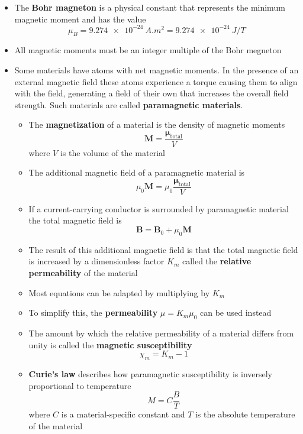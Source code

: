 \documentclass{article}
\begin{document}
\begin{itemize}
  \item The \textbf{Bohr magneton} is a physical constant that represents the minimum magnetic moment and has the value \[\mu_B = \qty{9.274e-24}{A.m^2} = \qty{9.274e-24}{J/T}\]

  \item All magnetic moments must be an integer multiple of the Bohr megneton

  \item Some materials have atoms with net magnetic moments. In the presence of an external magnetic field these atoms experience a torque causing them to align with the field, generating a field of their own that increases the overall field strength. Such materials are called \textbf{paramagnetic materials}.

        \begin{itemize}
          \item The \textbf{magnetization} of a material is the density of magnetic moments \[\mathbf{M} = \frac{\boldsymbol{\mu}_\textrm{total}}{V}\] where $V$ is the volume of the material

          \item The additional magnetic field of a paramagnetic material is \[\mu_0 \mathbf{M} = \mu_0 \frac{\boldsymbol{\mu}_\textrm{total}}{V}\]

          \item If a current-carrying conductor is surrounded by paramagnetic material the total magnetic field is \[\mathbf{B} = \mathbf{B}_0 + \mu_0 \mathbf{M}\]

          \item The result of this additional magnetic field is that the total magnetic field is increased by a dimensionless factor $K_m$ called the \textbf{relative permeability} of the material

          \item Most equations can be adapted by multiplying by $K_m$

          \item To simplify this, the \textbf{permeability} $\mu = K_m \mu_0$ can be used instead

          \item The amount by which the relative permeability of a material differs from unity is called the \textbf{magnetic susceptibility} \[\chi_m = K_m - 1\]

          \item \textbf{Curie's law} describes how paramagnetic susceptibility is inversely proportional to temperature \[M = C \frac{B}{T}\] where $C$ is a material-specific constant and $T$ is the absolute temperature of the material
        \end{itemize}


\end{itemize}
\end{document}

